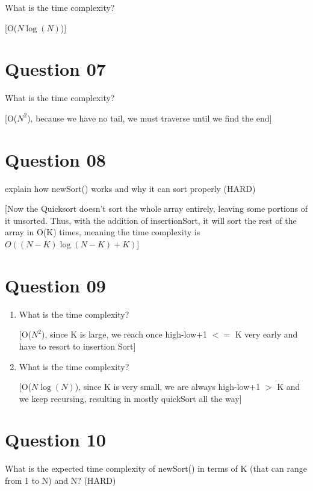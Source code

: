 \documentclass{article}
\begin{document}
\item What is the time complexity?

[O($N\log(N)$)]

\section{Question 07}

\item What is the time complexity?

[O($N^2$), because we have no tail, we must traverse until we find the end]

\section{Question 08}

\item explain how newSort() works and why it can sort properly (HARD)

[Now the Quicksort doesn't sort the whole array entirely, leaving some portions of it unsorted. Thus, with the addition
of insertionSort, it will sort the rest of the array in O(K) times, meaning the time complexity is
$O((N - K)\log(N- K) + K)$]

\section{Question 09}
\begin{enumerate}
\item What is the time complexity?

[O($N^2$), since K is large, we reach once high-low+1 $<=$ K very early and have to resort to insertion Sort]

\item What is the time complexity?

[O($N \log(N)$), since K is very small, we are always high-low+1 $>$ K and we keep recursing, resulting in mostly quickSort all the way]
\end{enumerate}

\section{Question 10}

\item What is the expected time complexity of newSort() in terms of K (that can range from 1 to N) and N? (HARD)
\\
\\
[from O($N(\log(N) - \log(K)$), we only quick sort a portion of the array. Whats that portion you may ask? why thats $N-K$. Thus, we quicksort  O($N(\log(N) - \log(K)$) = O($N\log(\frac{N}{K})$). When partioning, we have to multiply by $O(N)$. Next, we insertionSort the rest of whats left, which is $length <= K$ For each element it's correct location must be in the same subarray. So each element is at most K swaps away from correct position. Thus, O($NK$) for insertion sort.
\\
Therefore answer is: O($N\log(\frac{N}{K}) + NK$)]
\end{document}
